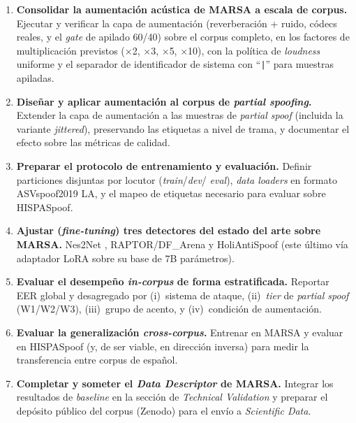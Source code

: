 \documentclass[11pt]{article}
\begin{document}
\begin{enumerate}[label=\textbf{OE\arabic*.},leftmargin=2.6em]
  \item \textbf{Consolidar la aumentaci\'on ac\'ustica de MARSA a escala
  de corpus.} Ejecutar y verificar la capa de aumentaci\'on
  (reverberaci\'on + ruido, c\'odecs reales, y el \emph{gate} de apilado
  60/40) sobre el corpus completo, en los factores de multiplicaci\'on
  previstos ($\times$2, $\times$3, $\times$5, $\times$10), con la
  pol\'itica de \emph{loudness} uniforme y el separador de identificador
  de sistema con ``\texttt{|}'' para muestras apiladas.

  \item \textbf{Dise\~nar y aplicar aumentaci\'on al corpus de
  \emph{partial spoofing}.} Extender la capa de aumentaci\'on a las
  muestras de \emph{partial spoof} (incluida la variante \emph{jittered}),
  preservando las etiquetas a nivel de trama, y documentar el efecto
  sobre las m\'etricas de calidad.

  \item \textbf{Preparar el protocolo de entrenamiento y evaluaci\'on.}
  Definir particiones disjuntas por locutor (\emph{train}/\emph{dev}/%
  \emph{eval}), \emph{data loaders} en formato ASVspoof2019 LA, y el mapeo
  de etiquetas necesario para evaluar sobre HISPASpoof.

  \item \textbf{Ajustar (\emph{fine-tuning}) tres detectores del estado
  del arte sobre MARSA.} Nes2Net \citep{nes2net}, RAPTOR/DF\_Arena
  \citep{dfarena} y HoliAntiSpoof \citep{holiantispoof} (este \'ultimo
  v\'ia adaptador LoRA sobre su base de 7B par\'ametros).

  \item \textbf{Evaluar el desempe\~no \emph{in-corpus} de forma
  estratificada.} Reportar EER global y desagregado por (i)~sistema de
  ataque, (ii)~\emph{tier} de \emph{partial spoof} (W1/W2/W3), (iii)~grupo
  de acento, y (iv)~condici\'on de aumentaci\'on.

  \item \textbf{Evaluar la generalizaci\'on \emph{cross-corpus}.} Entrenar
  en MARSA y evaluar en HISPASpoof (y, de ser viable, en direcci\'on
  inversa) para medir la transferencia entre corpus de espa\~nol.

  \item \textbf{Completar y someter el \emph{Data Descriptor} de MARSA.}
  Integrar los resultados de \emph{baseline} en la secci\'on de
  \emph{Technical Validation} y preparar el dep\'osito p\'ublico del
  corpus (Zenodo) para el env\'io a \emph{Scientific Data}.
\end{enumerate}
\end{document}
